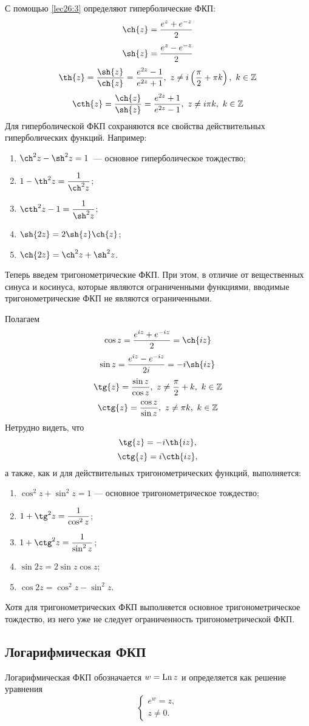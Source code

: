 \documentclass[../../main.tex]{subfiles}
\begin{document}
С помощью \eqref{lec26:3} определяют гиперболические ФКП:
\[
 \ch{z} = \frac{e^z + e^{-z}}{2}
\]
\[
 \sh{z} = \frac{e^z - e^{-z}}{2}
\]
\[
 \th{z} = \frac{\sh{z}}{\ch{z}} = \frac{e^{2z} - 1}{e^{2z} + 1},\ 
 z \neq i\left(\frac{\pi}{2} + \pi k\right),\ k \in \Z
\]
\[
 \cth{z} = \frac{\ch{z}}{\sh{z}} =
 \frac{e^{2z} + 1}{e^{2z} - 1},\ z \neq i \pi k,\ k \in \Z
\]
Для гиперболической ФКП сохраняются все свойства действительных 
гиперболических функций.
Например:
\begin{enumerate}
 \item $\ch^{2}{z} - \sh^{2}{z} = 1$~--- основное гиперболическое тождество;
 \item $1 - \th^{2}{z} = \dfrac{1}{\ch^{2}{z}}$;
 \item $\cth^{2}{z} - 1= \dfrac{1}{\sh^{2}{z}}$;
 \item $\sh{2z} = 2\sh{z} \ch{z}$;
 \item $\ch{2z} = \ch^{2}{z} + \sh^{2}{z}$.
\end{enumerate}

Теперь введем тригонометрические ФКП.
При этом, в отличие от вещественных синуса и косинуса, которые являются 
ограниченными функциями, вводимые тригонометрические ФКП не являются 
ограниченными.

Полагаем
\[\cos{z} = \frac{e^{iz} + e^{-iz}}{2} = \ch{iz}\]
\[
 \sin{z} = \frac{e^{iz} - e^{-iz}}{2i} = -i \sh{iz}
\]
\[
 \tg{z} = \frac{\sin{z}}{\cos{z}},\ z \neq \frac{\pi}{2} + k,\ k \in \Z
\]
\[
 \ctg{z} = \frac{\cos{z}}{\sin{z}},\ z \neq \pi k,\ k \in \Z
\]
Нетрудно видеть, что
\[\tg{z} = -i\th{iz},\]
\[\ctg{z} = i\cth{iz},\]
а также, как и для действительных тригонометрических функций, выполняется:
\begin{enumerate}
\item $\cos^2{z} + \sin^2{z} = 1\text{~--- основное тригонометрическое 
тождество}$;
\item $1 + \tg^{2}{z} = \dfrac{1}{\cos^2{z}}$;
\item $1 + \ctg^{2}{z} = \dfrac{1}{\sin^2{z}}$;
\item $\sin{2z} = 2 \sin{z} \cos{z}$;
\item $\cos{2z} = \cos^{2}{z} -  \sin^{2}{z}$.
\end{enumerate}

Хотя для тригонометрических ФКП выполняется основное тригонометрическое
тождество, из него уже не следует ограниченность 
тригонометрической ФКП.

\subsection{Логарифмическая ФКП}
Логарифмическая ФКП обозначается $w = \operatorname{Ln}{z}$ 
и определяется как решение уравнения 
\begin{equation}
 \label{lec26;4}
 \begin{cases}
   e^{w} = z, \\
   z \neq 0.
 \end{cases}
\end{equation}
\end{document}
